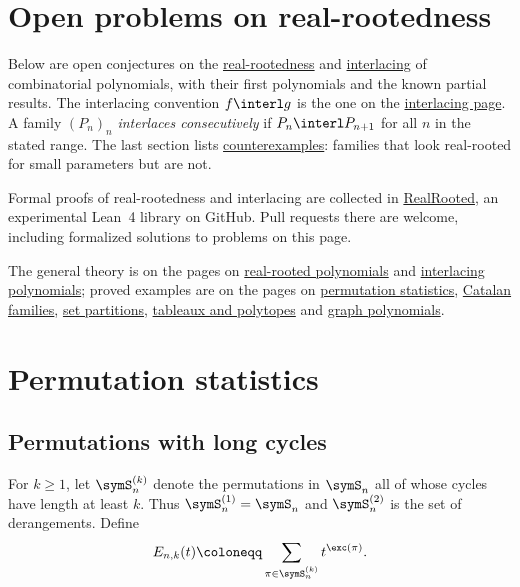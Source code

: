 


\section[realrootedOpenProblems]{Open problems on real-rootedness}

Below are open conjectures on the
\hyperref[realRootedPolynomial]{real-rootedness} and
\hyperref[interlacingPolynomials]{interlacing} of combinatorial
polynomials, with their first polynomials and the known partial results.
The interlacing convention $f\interl g$ is the one on the
\hyperref[interlacesPolynomial]{interlacing page}.  A family $(P_n)_n$
\emph{interlaces consecutively} if $P_{n}\interl P_{n+1}$ for all $n$ in
the stated range.  The last section lists
\hyperref[realRootedCounterexamples]{counterexamples}: families that look
real-rooted for small parameters but are not.

Formal proofs of real-rootedness and interlacing are collected in
\href{https://github.com/PerAlexandersson/RealRooted}{RealRooted}, an
experimental Lean~4 library on GitHub.  Pull requests there are welcome,
including formalized solutions to problems on this page.

The general theory is on the pages on
\hyperref[polynomialRootIntro]{real-rooted polynomials} and
\hyperref[interlacingPolynomials]{interlacing polynomials}; proved examples
are on the pages on \hyperref[realRootedWords]{permutation statistics},
\hyperref[realRootedCatalan]{Catalan families},
\hyperref[sturmSetPartitions]{set partitions},
\hyperref[realRootedTableaux]{tableaux and polytopes} and
\hyperref[realRootedMatching]{graph polynomials}.


\section[openProblemsPermutations]{Permutation statistics}

\subsection[openProblemsCycleRestricted]{Permutations with long cycles}

For $k\geq 1$, let $\symS_n^{(k)}$ denote the permutations in $\symS_n$
all of whose cycles have length at least $k$.  Thus $\symS_n^{(1)}=\symS_n$
and $\symS_n^{(2)}$ is the set of derangements.  Define
\[
  E_{n,k}(t)\coloneqq\sum_{\pi\in\symS_n^{(k)}}t^{\exc(\pi)}.
\]

